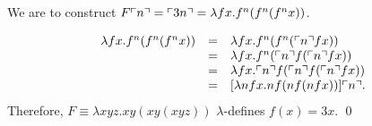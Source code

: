 \begin{pf} \rm
 We are to construct $F \ulcorner{n}\urcorner = \ulcorner{3n}\urcorner = \lambda fx. f^n (f^n (f^n x))$.

\[
 \begin{array}{rcl}
  \lambda fx. f^n (f^n (f^n x)) & = & \lambda fx. f^n (f^n (\ulcorner{n}\urcorner f x)) \\
  & = & \lambda fx. f^n (\ulcorner{n}\urcorner f (\ulcorner{n}\urcorner f x)) \\
  & = & \lambda fx. \ulcorner{n}\urcorner f (\ulcorner{n}\urcorner f (\ulcorner{n}\urcorner f x)) \\
  & = & [\lambda nfx. nf (nf (nfx))] \ulcorner{n}\urcorner.
 \end{array}
\]
Therefore, $F \equiv \lambda xyz. xy(xy(xyz))$ $\lambda$-defines $f(x)=3x$.
\qed
\end{pf}
